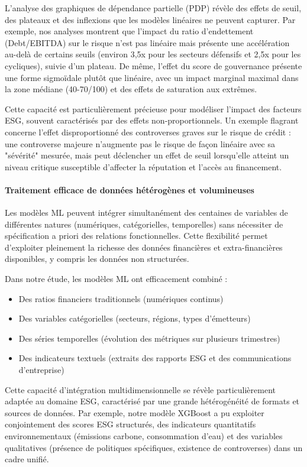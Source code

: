 L'analyse des graphiques de dépendance partielle (PDP) révèle des effets de seuil, des plateaux et des inflexions que les modèles linéaires ne peuvent capturer. Par exemple, nos analyses montrent que l'impact du ratio d'endettement (Debt/EBITDA) sur le risque n'est pas linéaire mais présente une accélération au-delà de certains seuils (environ 3,5x pour les secteurs défensifs et 2,5x pour les cycliques), suivie d'un plateau. De même, l'effet du score de gouvernance présente une forme sigmoïdale plutôt que linéaire, avec un impact marginal maximal dans la zone médiane (40-70/100) et des effets de saturation aux extrêmes.

Cette capacité est particulièrement précieuse pour modéliser l'impact des facteurs ESG, souvent caractérisés par des effets non-proportionnels. Un exemple flagrant concerne l'effet disproportionné des controverses graves sur le risque de crédit : une controverse majeure n'augmente pas le risque de façon linéaire avec sa "sévérité" mesurée, mais peut déclencher un effet de seuil lorsqu'elle atteint un niveau critique susceptible d'affecter la réputation et l'accès au financement.

\paragraph{Traitement efficace de données hétérogènes et volumineuses}

Les modèles ML peuvent intégrer simultanément des centaines de variables de différentes natures (numériques, catégorielles, temporelles) sans nécessiter de spécification a priori des relations fonctionnelles. Cette flexibilité permet d'exploiter pleinement la richesse des données financières et extra-financières disponibles, y compris les données non structurées.

Dans notre étude, les modèles ML ont efficacement combiné :
\begin{itemize}
    \item Des ratios financiers traditionnels (numériques continus)
    \item Des variables catégorielles (secteurs, régions, types d'émetteurs)
    \item Des séries temporelles (évolution des métriques sur plusieurs trimestres)
    \item Des indicateurs textuels (extraits des rapports ESG et des communications d'entreprise)
\end{itemize}

Cette capacité d'intégration multidimensionnelle se révèle particulièrement adaptée au domaine ESG, caractérisé par une grande hétérogénéité de formats et sources de données. Par exemple, notre modèle XGBoost a pu exploiter conjointement des scores ESG structurés, des indicateurs quantitatifs environnementaux (émissions carbone, consommation d'eau) et des variables qualitatives (présence de politiques spécifiques, existence de controverses) dans un cadre unifié.

